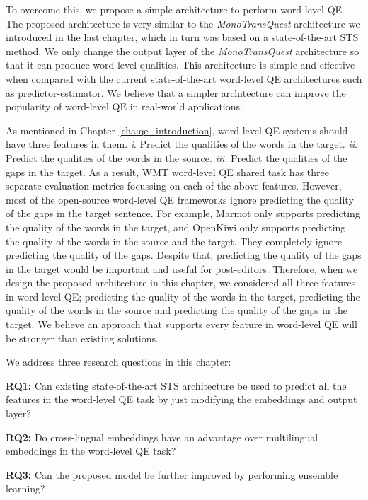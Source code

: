 To overcome this, we propose a simple architecture to perform word-level QE. The proposed architecture is very similar to the \textit{MonoTransQuest} architecture we introduced in the last chapter, which in turn was based on a state-of-the-art STS method. We only change the output layer of the \textit{MonoTransQuest} architecture so that it can produce word-level qualities. This architecture is simple and effective when compared with the current state-of-the-art word-level QE architectures such as predictor-estimator. We believe that a simpler architecture can improve the popularity of word-level QE in real-world applications. 

As mentioned in Chapter \ref{cha:qe_introduction}, word-level QE systems should have three features in them. \textit{i}. Predict the qualities of the words in the target. \textit{ii}. Predict the qualities of the words in the source. \textit{iii}. Predict the qualities of the gaps in the target. As a result, WMT word-level QE shared task has three separate evaluation metrics focussing on each of the above features. However, most of the open-source word-level QE frameworks ignore predicting the quality of the gaps in the target sentence. For example, Marmot \autocite{logacheva-etal-2016-marmot} only supports predicting the quality of the words in the target, and OpenKiwi \autocite{kepler-etal-2019-openkiwi} only supports predicting the quality of the words in the source and the target. They completely ignore predicting the quality of the gaps. Despite that, predicting the quality of the gaps in the target would be important and useful for post-editors. Therefore, when we design the proposed architecture in this chapter, we considered all three features in word-level QE; predicting the quality of the words in the target, predicting the quality of the words in the source and predicting the quality of the gaps in the target. We believe an approach that supports every feature in word-level QE will be stronger than existing solutions.

We address three research questions in this chapter:

\textbf{RQ1:} Can existing state-of-the-art STS architecture be used to predict all the features in the word-level QE task by just modifying the embeddings and output layer?

\textbf{RQ2:} Do cross-lingual embeddings have an advantage over multilingual embeddings in the word-level QE task?

\textbf{RQ3:} Can the proposed model be further improved by performing ensemble learning?

